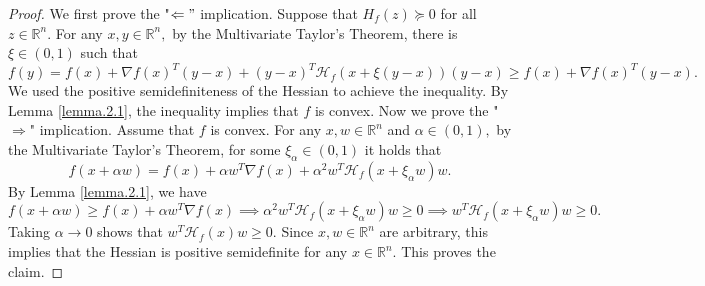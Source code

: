 \begin{proof}
We first prove the "$\Leftarrow"$ implication. Suppose that $H_{f}(z) \succeq 0$ for all $z\in\mathbb{R}^{n}.$ For any $x,y\in\mathbb{R}^{n},$ by the Multivariate Taylor's Theorem, there is $\xi \in (0,1)$ such that $$f(y)=f(x)+\nabla f(x)^{T}(y-x)+(y-x)^{T}\mathcal{H}_{f}(x+\xi(y-x))(y-x)\geq f(x) + \nabla f(x)^{T}(y-x).$$ We used the positive semidefiniteness of the Hessian to achieve the inequality. By Lemma \ref{lemma.2.1}, the inequality implies that $f$ is convex. 
Now we prove the "$\Rightarrow$" implication. Assume that $f$ is convex. For any $x,w\in\mathbb{R}^{n}$ and $\alpha\in(0,1),$ by the Multivariate Taylor's Theorem, for some $\xi_{\alpha}\in (0,1)$ it holds that $$f(x+\alpha w)=f(x)+\alpha w^{T}\nabla f(x) + \alpha^{2} w^{T}\mathcal{H}_{f}(x+\xi_{\alpha}w)w.$$ By Lemma \ref{lemma.2.1}, we have $$f(x+\alpha w)\geq f(x)+\alpha w^{T}\nabla f(x) \implies \alpha^{2} w^{T}\mathcal{H}_{f}(x+\xi_{\alpha}w)w\geq 0 \implies w^{T}\mathcal{H}_{f}(x+\xi_{\alpha}w)w\geq 0.$$ Taking $\alpha\longrightarrow 0$ shows that $w^{T}\mathcal{H}_{f}(x)w\geq 0.$ Since $x, w\in\mathbb{R}^{n}$ are arbitrary, this implies that the Hessian is positive semidefinite for any $x\in\mathbb{R}^{n}.$
This proves the claim.
\end{proof}
\newpage
